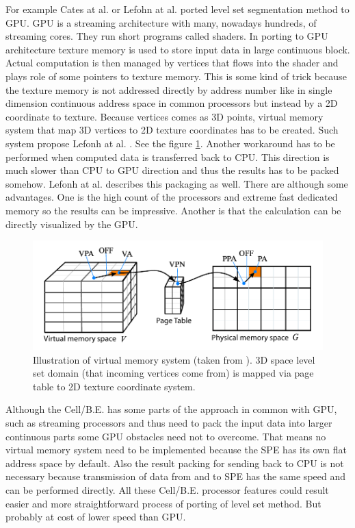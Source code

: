 \par
For example Cates at al. \cite{GIST} or Lefohn at al. \cite{lefonhGPUSolver} ported level set segmentation method to GPU.
GPU is a streaming architecture with many, nowadays hundreds, of streaming cores. They run short programs called shaders.
In porting to GPU architecture texture memory is used to store input data in large continuous block.
Actual computation is then managed by vertices that flows into the shader and plays role of some pointers to texture memory.
This is some kind of trick because the texture memory is not addressed directly by address number like in single dimension continuous address space in common processors but instead by a 2D coordinate to texture.
Because vertices comes as 3D points, virtual memory system that map 3D vertices to 2D texture coordinates has to be created.
Such system propose Lefonh at al. \cite{lefonhGPUSolver}. See the figure \ref{fg:virtual memory on GPU}.
Another workaround has to be performed when computed data is transferred back to CPU.
This direction is much slower than CPU to GPU direction and thus the results has to be packed somehow.
Lefonh at al. \cite{lefonhGPUSolver} describes this packaging as well.
There are although some advantages.
One is the high count of the processors and extreme fast dedicated memory so the results can be impressive.
Another is that the calculation can be directly visualized by the GPU.

\begin{figure}
    \centering
    \includegraphics[width=\textwidth]{data/png/gpuVirtMemory}
    \caption[GPU virtual memory]{Illustration of virtual memory system (taken from \cite{lefonhGPUSolver}). 3D space level set domain (that incoming vertices come from) is mapped via page table to 2D texture coordinate system.}
    \label{fg:virtual memory on GPU}
\end{figure}

\par
Although the Cell/B.E. has some parts of the approach in common with GPU, such as streaming processors and thus need to pack the input data into larger continuous parts some GPU obstacles need not to overcome.
That means no virtual memory system need to be implemented because the SPE has its own flat address space by default.
Also the result packing for sending back to CPU is not necessary because transmission of data from and to SPE has the same speed and can be performed directly.
All these Cell/B.E. processor features could result easier and more straightforward process of porting of level set method.
But probably at cost of lower speed than GPU.

